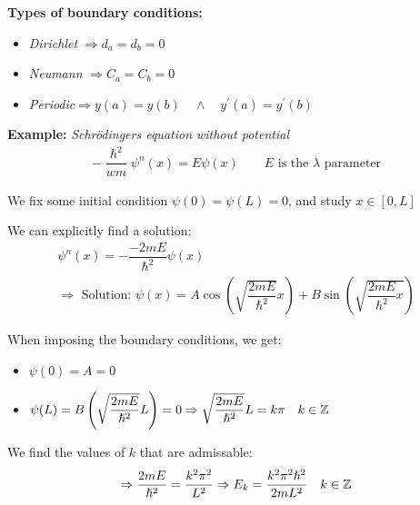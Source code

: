 \par\bigskip
\noindent\textbf{Types of boundary conditions:}\par
\begin{itemize}
  \item \textit{Dirichlet} $\Rightarrow d_a=d_b=0$
  \item\textit{Neumann} $\Rightarrow C_a=C_b=0$
  \item\textit{Periodic}$\Rightarrow y(a) = y(b)\quad\wedge\quad y^{\prime}(a) = y^{\prime}(b)$
\end{itemize}
\par\bigskip
\noindent\textbf{Example:} \textit{Schrödingers equation without potential}
\begin{equation*}
  \begin{gathered}
    -\dfrac{\hslash^2}{wm}\psi^n(x) = E\psi(x)\qquad\text{$E$ is the $\lambda$ parameter}
  \end{gathered}
\end{equation*}\par
\noindent We fix some initial condition $\psi(0) = \psi(L) = 0$, and study $x\in[0,L]$\par
\noindent We can explicitly find a solution:
\begin{equation*}
  \begin{gathered}
    \psi^n(x) = -\dfrac{-2mE}{\hslash^2}\psi(x)\\
    \Rightarrow\text{ Solution: } \psi(x) = A\cos\left(\sqrt{\dfrac{2mE}{\hslash^2}}x\right)+B\sin\left(\sqrt{\dfrac{2mE}{\hslash^2}x}\right)
  \end{gathered}
\end{equation*}\par
\noindent When imposing the boundary conditions, we get:\par
\begin{itemize}
  \item $\psi(0) = A=0$
  \item $\psi(L) = B\left(\sqrt{\dfrac{2mE}{\hslash^2}}L\right) = 0\Rightarrow \sqrt{\dfrac{2mE}{\hslash^2}}L = k\pi\quad k\in\mathbb{Z}$
\end{itemize}\par
\noindent We find the values of $k$ that are admissable:
\begin{equation*}
  \begin{gathered}
    \Rightarrow \dfrac{2mE}{\hslash^2} = \dfrac{k^2\pi^2}{L^2}\Rightarrow E_k = \dfrac{k^2\pi^2\hslash^2}{2mL^2}\quad k\in\mathbb{Z}
  \end{gathered}
\end{equation*}
